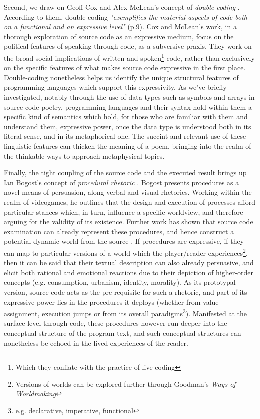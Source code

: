 Second, we draw on Geoff Cox and Alex McLean's concept of \emph{double-coding} \citep{cox_speaking_2013}. According to them, double-coding \emph{"exemplifies the material aspects of code both on a functional and an expressive level"} (p.9). Cox and McLean's work, in a thorough exploration of source code as an expressive medium, focus on the political features of speaking through code, as a subversive praxis. They work on the broad social implications of written and spoken\footnote{Which they conflate with the practice of live-coding} code, rather than exclusively on the specific features of what makes source code expressive in the first place. Double-coding nonetheless helps us identify the unique structural features of programming languages which support this expressivity. As we've briefly investigated, notably through the use of data types such as symbols and arrays in source code poetry, programming languages and their syntax hold within them a specific kind of semantics which hold, for those who are familiar with them and understand them, expressive power, once the data type is understood both in its literal sense, and in its metaphorical one. The succint and relevant use of these linguistic features can thicken the meaning of a poem, bringing into the realm of the thinkable ways to approach metaphysical topics.

Finally, the tight coupling of the source code and the executed result brings up Ian Bogost's concept of \emph{procedural rhetoric} \citep{bogost_rhetoric_2008}. Bogost presents procedures as a novel means of persuasion, along verbal and visual rhetorics. Working within the realm of videogames, he outlines that the design and execution of processes afford particular stances which, in turn, influence a specific worldview, and therefore arguing for the validity of its existence. Further work has shown that source code examination can already represent these procedures, and hence construct a potential dynamic world from the source \citep{tirrell_dumb_2012}. If procedures are expressive, if they can map to particular versions of a world which the player/reader experiences\footnote{Versions of worlds can be explored further through Goodman's \emph{Ways of Worldmaking}}, then it can be said that their textual description can also already persuasive, and elicit both rational and emotional reactions due to their depiction of higher-order concepts (e.g. consumption, urbanism, identity, morality). As its prototypal version, source code acts as the pre-requisite for such a rhetoric, and part of its expressive power lies in the procedures it deploys (whether from value assignment, execution jumps or from its overall paradigms\footnote{e.g. declarative, imperative, functional}). Manifested at the surface level through code, these procedures however run deeper into the conceptual structure of the program text, and such conceptual structures can nonetheless be echoed in the lived experiences of the reader.

